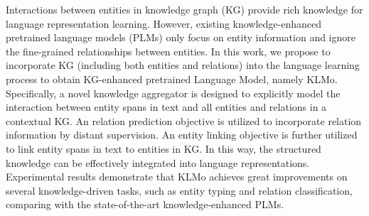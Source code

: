 Interactions between entities in knowledge graph (KG) provide rich knowledge for language representation learning. However, existing knowledge-enhanced pretrained language models (PLMs) only focus on entity information and ignore the fine-grained relationships between entities. In this work, we propose to incorporate KG (including both entities and relations) into the language learning process to obtain KG-enhanced pretrained Language Model, namely KLMo. Specifically, a novel knowledge aggregator is designed to explicitly model the interaction between entity spans in text and all entities and relations in a contextual KG. An relation prediction objective is utilized to incorporate relation information by distant supervision. An entity linking objective is further utilized to link entity spans in text to entities in KG. In this way, the structured knowledge can be effectively integrated into language representations. Experimental results demonstrate that KLMo achieves great improvements on several knowledge-driven tasks, such as entity typing and relation classification, comparing with the state-of-the-art knowledge-enhanced PLMs.
